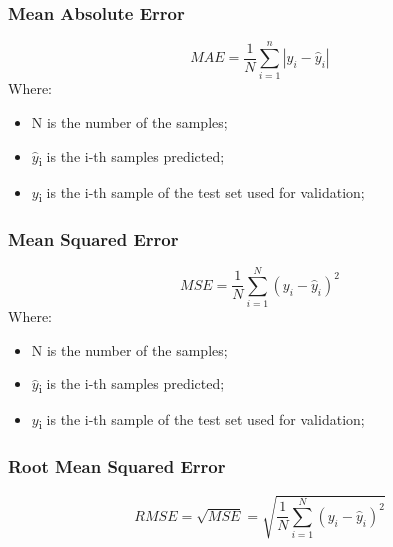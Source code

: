 \subsubsection{Mean Absolute Error}
\begin{equation}
MAE = \frac{1}{N}\sum_{i=1}^{n}|y_i-\hat{y}_i|
\end{equation}
Where:
\begin{itemize}
    \item N is the number of the samples;
    \item $\hat{y}$\textsubscript{i} is the i-th samples predicted;
    \item $y$\textsubscript{i} is the i-th sample of the test set used for validation;
\end{itemize}
\pagebreak
\subsubsection{Mean Squared Error}
\begin{equation}
MSE = \frac{1}{N}\sum_{i=1}^{N}(y_i-\hat{y}_i)^2
\end{equation}
Where:
\begin{itemize}
    \item N is the number of the samples;
    \item $\hat{y}$\textsubscript{i} is the i-th samples predicted;
    \item $y$\textsubscript{i} is the i-th sample of the test set used for validation;
\end{itemize}
\subsubsection{Root Mean Squared Error}
\begin{equation}
RMSE = \sqrt{MSE}= \sqrt{\frac{1}{N}\sum_{i=1}^{N}(y_i-\hat{y}_i)^2}
\end{equation}
